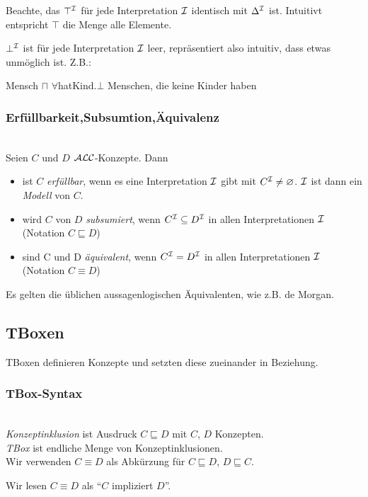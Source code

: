 Beachte, das $\top^{\mathcal{I}}$ für jede Interpretation $\mathcal{I}$ identisch mit $\Delta^{\mathcal{I}}$ ist. Intuitivt entspricht $\top$ die Menge alle Elemente. 

$\bot^{\mathcal{I}}$ ist für jede Interpretation $\mathcal{I}$ leer, repräsentiert also intuitiv, dass etwas unmöglich ist. Z.B.:

Mensch $\sqcap$ $\forall$hatKind.$\bot$
Menschen, die keine Kinder haben

{\subsubsection{Erfüllbarkeit,Subsumtion,Äquivalenz}\label{erfuxfcllbarkeit-subsumtion-uxe4quivalenz}}

\begin{definition} \\
Seien $C$ und $D$ $\mathcal{A}\mathcal{L}\mathcal{C}$-Konzepte. Dann

\begin{itemize}
\item
  ist $C$ \emph{erfüllbar}, wenn es eine Interpretation $\mathcal{I}$ gibt mit
  $C^{\mathcal{I}} \neq \varnothing$. $\mathcal{I}$ ist dann ein \emph{Modell} von
  $C$.
\item
  wird $C$ von $D$ \emph{subsumiert}, wenn $C^{\mathcal{I}} \subseteq D^{\mathcal{I}}$
  in allen Interpretationen $\mathcal{I}$ (Notation $C \sqsubseteq D$)
\item
  sind C und D \emph{äquivalent}, wenn $C^{\mathcal{I}} = D^{\mathcal{I}}$ in allen
  Interpretationen $\mathcal{I}$ (Notation $C \equiv D$)
\end{itemize}
\end{definition}

Es gelten die üblichen aussagenlogischen Äquivalenten, wie z.B. de
Morgan.

\subsection{TBoxen}\label{tboxen}

TBoxen definieren Konzepte und setzten diese zueinander in Beziehung.

\subsubsection{TBox-Syntax}\label{tboxsyntax}

\begin{definition} \\
\emph{Konzeptinklusion} ist Ausdruck $C \sqsubseteq D$ mit $C$, $D$ Konzepten. \\
\emph{TBox} ist endliche Menge von Konzeptinklusionen. \\
Wir verwenden $C \equiv D$ als Abkürzung für $C \sqsubseteq D$, $D \sqsubseteq C$. 

Wir lesen $C \equiv D$ als \enquote{$C$ impliziert $D$}.
\end{definition}

